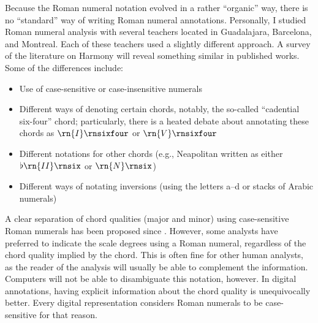 Because the Roman numeral notation evolved in a rather
``organic'' way, there is no ``standard'' way of writing
Roman numeral annotations.
Personally, I studied Roman numeral analysis with several
teachers located in Guadalajara, Barcelona, and Montreal.
Each of these teachers used a slightly different approach. A
survey of the literature on Harmony will reveal something
similar in published works. Some of the differences include:
\begin{itemize}
    \item Use of case-sensitive or case-insensitive numerals
    \item Different ways of denoting certain chords,
    notably, the so-called ``cadential six-four'' chord;
    particularly, there is a heated debate about annotating
    these chords as $\rn{I}\rnsixfour$ or $\rn{V}\rnsixfour$
    \item Different notations for other chords (e.g.,
    Neapolitan written as either $\flat\rn{II}\rnsix$ or
    $\rn{N}\rnsix$)
    \item Different ways of notating inversions (using the
    letters a--d or stacks of Arabic numerals)
\end{itemize}

A clear separation of chord qualities (major and minor)
using case-sensitive Roman numerals has been proposed since
\textcite{weber1817versuch}. However, some analysts have
preferred to indicate the scale degrees using a Roman
numeral, regardless of the chord quality implied by the
chord. This is often fine for other human analysts, as the
reader of the analysis will usually be able to complement
the information. Computers will not be able to disambiguate
this notation, however. In digital annotations, having
explicit information about the chord quality is
unequivocally better. Every digital representation considers
Roman numerals to be case-sensitive for that reason.


